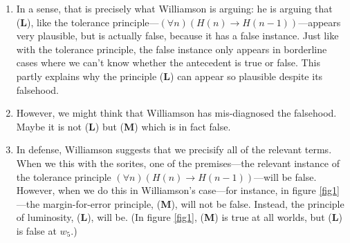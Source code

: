 \documentclass[landscape, two column, full page,leqno]{article}
\newcommand{\qe}{\begin{enumerate}}
\newcommand{\ze}{\end{enumerate}}
\newcommand{\p}{\item}
\newcommand{\tbf}{\textbf}
\begin{document}
	\qe
	\p In a sense, that is precisely what Williamson is arguing: he is arguing that (\tbf{L}), like the tolerance principle---$(\forall n) (H(n) \to H(n-1))$---appears very plausible, but is actually false, because it has a false instance.  Just like with the tolerance principle, the false instance only appears in borderline cases where we can't know whether the antecedent is true or false.  This partly explains why the principle (\tbf{L}) can appear so plausible despite its falsehood.  
	\p However, we might think that Williamson has mis-diagnosed the falsehood.  Maybe it is not (\tbf{L}) but (\tbf{M}) which is in fact false.  
	\p In defense, Williamson suggests  that we  precisify all of the relevant terms.  When we this with the sorites, one of the premises---the relevant instance of the tolerance principle $(\forall n) (H(n) \to H(n-1))$---will be false.  However, when we do this in Williamson's case---for instance, in figure \ref{fig1}---the margin-for-error principle, (\tbf{M}),  will not be false.  Instead, the principle of luminosity, (\tbf{L}), will be.  (In figure \ref{fig1}, (\tbf{M}) is true at all worlds, but (\tbf{L}) is false at $w_5$.)
	\ze 
\end{document}
